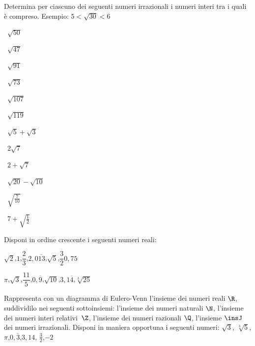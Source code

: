 \begin{esercizio}
\label{ese:1.4}
 Determina per ciascuno dei seguenti numeri irrazionali i numeri interi tra i quali è compreso. Esempio: \(5<\sqrt{30}<6\)
\begin{multicols}{4}
\begin{enumeratea}
 \item~\(\sqrt{50}\)
 \item~\(\sqrt{47}\)
 \item~\(\sqrt{91}\)
 \item~\(\sqrt{73}\)
 \item~\(\sqrt{107}\)
 \item~\(\sqrt{119}\)
 \item~\(\sqrt 5+\sqrt 3\)
 \item~\(2\sqrt 7\)
 \item~\(2+\sqrt 7\)
 \item~\(\sqrt{20}-\sqrt{10}\)
 \item~\(\sqrt{\frac 7{10}}\)
 \item~\(7+\sqrt{\frac 1 2}\)
\end{enumeratea}
\end{multicols}
\end{esercizio}

\begin{esercizio}
\label{ese:1.5}
 Disponi in ordine crescente i seguenti numeri reali:
 \begin{enumeratea}
 \item \(\sqrt 2\),\quad \(1\),\quad \(\dfrac 2 3\),\quad \(2,0\overline{13}\),\quad \(\sqrt 5\),\quad \(\dfrac 3 2\)\quad \(0,75\)
 \item \(\pi\),\quad \(\sqrt 3\),\quad \(\dfrac{11} 5\),\quad \(0,\overline 9\),\quad \(\sqrt{10}\),\quad \(3,1\overline 4\),\quad \(\sqrt[3]{25}\)
 \end{enumeratea}
\end{esercizio}

\begin{esercizio}
\label{ese:1.6}
 Rappresenta con un diagramma di Eulero-Venn l'insieme dei numeri reali 
\(\R\), suddividilo nei seguenti sottoinsiemi: l'insieme dei numeri 
naturali \(\N\), l'insieme dei numeri interi relativi~\(\Z\), l'insieme dei 
numeri razionali \(\Q\), l'insieme \(\insJ\) dei numeri irrazionali. 
Disponi in maniera opportuna i seguenti numeri: \(\sqrt 3\),\quad 
\(\sqrt[3]5\),\quad\(\pi\),\quad \(0,\overline 3\),\quad \(3,14\),\quad 
\(\frac 3 2\),\quad\(-2\)
\end{esercizio}

